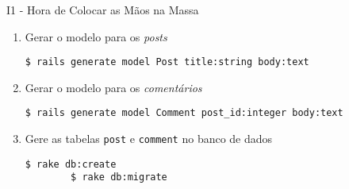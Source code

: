 \begin{frame}{I1 - Hora de Colocar as Mãos na Massa}
	\begin{enumerate}
    \item Gerar o modelo para os \textit{posts} 
     \begin{lstlisting}[style=BashInputBasicStyle]
				$ rails generate model Post title:string body:text
     \end{lstlisting}
		\item Gerar o modelo para os \textit{comentários} 
     \begin{lstlisting}[style=BashInputBasicStyle]
				$ rails generate model Comment post_id:integer body:text
     \end{lstlisting}
    \item Gere as tabelas \verb|post| e \verb|comment| no banco de dados
    \begin{lstlisting}[style=BashInputBasicStyle]
    	$ rake db:create
	    $ rake db:migrate
    \end{lstlisting}
	\end{enumerate}  
\end{frame}